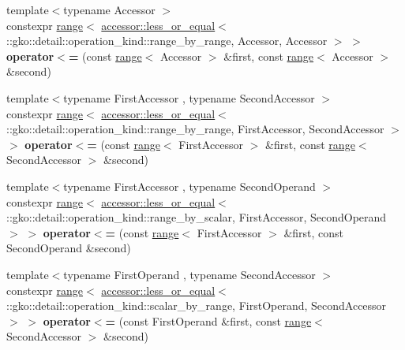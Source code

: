 \begin{DoxyCompactItemize}
\item 
\mbox{\label{namespacegko_a41355e557a67620659b116f79ba7074d}} 
{\footnotesize template$<$typename Accessor $>$ }\\constexpr \hyperlink{classgko_1_1range}{range}$<$ \hyperlink{structgko_1_1accessor_1_1less__or__equal}{accessor\+::less\+\_\+or\+\_\+equal}$<$ \+::gko\+::detail\+::operation\+\_\+kind\+::range\+\_\+by\+\_\+range, Accessor, Accessor $>$ $>$ {\bfseries operator$<$=} (const \hyperlink{classgko_1_1range}{range}$<$ Accessor $>$ \&first, const \hyperlink{classgko_1_1range}{range}$<$ Accessor $>$ \&second)
\item 
\mbox{\label{namespacegko_aff69ca2e7cb612911bd85ae82bf0c0b8}} 
{\footnotesize template$<$typename First\+Accessor , typename Second\+Accessor $>$ }\\constexpr \hyperlink{classgko_1_1range}{range}$<$ \hyperlink{structgko_1_1accessor_1_1less__or__equal}{accessor\+::less\+\_\+or\+\_\+equal}$<$ \+::gko\+::detail\+::operation\+\_\+kind\+::range\+\_\+by\+\_\+range, First\+Accessor, Second\+Accessor $>$ $>$ {\bfseries operator$<$=} (const \hyperlink{classgko_1_1range}{range}$<$ First\+Accessor $>$ \&first, const \hyperlink{classgko_1_1range}{range}$<$ Second\+Accessor $>$ \&second)
\item 
\mbox{\label{namespacegko_ab59c44515b0155c808f9d77b5d430cac}} 
{\footnotesize template$<$typename First\+Accessor , typename Second\+Operand $>$ }\\constexpr \hyperlink{classgko_1_1range}{range}$<$ \hyperlink{structgko_1_1accessor_1_1less__or__equal}{accessor\+::less\+\_\+or\+\_\+equal}$<$ \+::gko\+::detail\+::operation\+\_\+kind\+::range\+\_\+by\+\_\+scalar, First\+Accessor, Second\+Operand $>$ $>$ {\bfseries operator$<$=} (const \hyperlink{classgko_1_1range}{range}$<$ First\+Accessor $>$ \&first, const Second\+Operand \&second)
\item 
\mbox{\label{namespacegko_a1165979d19164d7762c6fdf560bf1b15}} 
{\footnotesize template$<$typename First\+Operand , typename Second\+Accessor $>$ }\\constexpr \hyperlink{classgko_1_1range}{range}$<$ \hyperlink{structgko_1_1accessor_1_1less__or__equal}{accessor\+::less\+\_\+or\+\_\+equal}$<$ \+::gko\+::detail\+::operation\+\_\+kind\+::scalar\+\_\+by\+\_\+range, First\+Operand, Second\+Accessor $>$ $>$ {\bfseries operator$<$=} (const First\+Operand \&first, const \hyperlink{classgko_1_1range}{range}$<$ Second\+Accessor $>$ \&second)

\end{DoxyCompactItemize}
